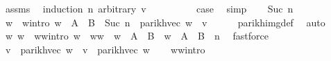 \begin{isabellebody}
%
\isadelimproof
%
\endisadelimproof
%
\isatagproof
{}\isamarkupfalse%
\ assms\ \isamarkupfalse%
\ {\isacharparenleft}{\kern0pt}induction\ n\ arbitrary{\isacharcolon}{\kern0pt}\ v{\isacharparenright}{\kern0pt}\isanewline
\ \ \isamarkupfalse%
\ {}\isanewline
\ \ \isamarkupfalse%
\ \isamarkupfalse%
\ {\isacharquery}{\kern0pt}case\ \isamarkupfalse%
\ simp\isanewline
{}\isamarkupfalse%
\isanewline
\ \ \isamarkupfalse%
\ {\isacharparenleft}{\kern0pt}Suc\ n{\isacharparenright}{\kern0pt}\isanewline
\ \ \isamarkupfalse%
\ \isamarkupfalse%
\ w\ \ w{\isacharunderscore}{\kern0pt}intro{\isacharcolon}{\kern0pt}\ {\isachardoublequoteopen}w\ {\isasymin}\ {\isacharparenleft}{\kern0pt}A\ {\isasymunion}\ B{\isacharparenright}{\kern0pt}\ {\isacharcircum}{\kern0pt}{\isacharcircum}{\kern0pt}\ {\isacharparenleft}{\kern0pt}Suc\ n{\isacharparenright}{\kern0pt}\ {\isasymand}\ parikh{\isacharunderscore}{\kern0pt}vec\ w\ {\isacharequal}{\kern0pt}\ v{\isachardoublequoteclose}\isanewline
\ \ \ \ \isamarkupfalse%
\ parikh{\isacharunderscore}{\kern0pt}img{\isacharunderscore}{\kern0pt}def\ \isamarkupfalse%
\ auto\isanewline
\ \ \isamarkupfalse%
\ \isamarkupfalse%
\ w{}\ w{}\ \ w{}{\isacharunderscore}{\kern0pt}w{}{\isacharunderscore}{\kern0pt}intro{\isacharcolon}{\kern0pt}\ {\isachardoublequoteopen}w\ {\isacharequal}{\kern0pt}\ w{}{\isacharat}{\kern0pt}w{}\ {\isasymand}\ w{}\ {\isasymin}\ A\ {\isasymunion}\ B\ {\isasymand}\ w{}\ {\isasymin}\ {\isacharparenleft}{\kern0pt}A\ {\isasymunion}\ B{\isacharparenright}{\kern0pt}\ {\isacharcircum}{\kern0pt}{\isacharcircum}{\kern0pt}\ n{\isachardoublequoteclose}\ \isamarkupfalse%
\ fastforce\isanewline
\ \ \isamarkupfalse%
\ {\isacharquery}{\kern0pt}v{}\ {\isacharequal}{\kern0pt}\ {\isachardoublequoteopen}parikh{\isacharunderscore}{\kern0pt}vec\ w{}{\isachardoublequoteclose}\ \ {\isacharquery}{\kern0pt}v{}\ {\isacharequal}{\kern0pt}\ {\isachardoublequoteopen}parikh{\isacharunderscore}{\kern0pt}vec\ w{}{\isachardoublequoteclose}\isanewline
\ \ \isamarkupfalse%
\ w{}{\isacharunderscore}{\kern0pt}w{}{\isacharunderscore}{\kern0pt}intro\ \isamarkupfalse%

\end{isabellebody}
